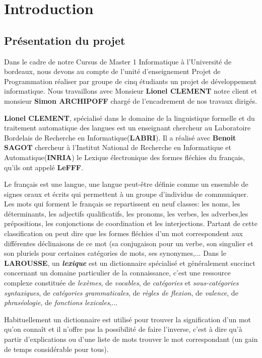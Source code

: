 \clearpage
\setcounter{page}{1}
\pagestyle{plain}
\newpage
\section{Introduction}
\subsection{Présentation du projet}
Dans le cadre de notre Cursus de Master 1 Informatique à l'Université de bordeaux, nous devons au compte de l'unité d'enseignement Projet de Programmation réaliser par groupe de cinq étudiants un projet de développement informatique. Nous travaillons avec Monsieur \textbf{Lionel CLEMENT} notre client et monsieur \textbf{Simon ARCHIPOFF} chargé de l'encadrement de nos travaux dirigés.


{\textbf{Lionel CLEMENT}, spécialisé dans le domaine de la linguistique formelle et du traitement automatique des langues est un enseignant chercheur au Laboratoire Bordelais de Recherche en Informatique(\textbf{LABRI}). Il a réalisé avec \textbf{Benoit SAGOT} chercheur à l'Institut National de Recherche en Informatique et Automatique(\textbf{INRIA})  le Lexique électronique des formes fléchies du français, qu'ils ont appelé \textbf{LeFFF}.\par}
{Le français est une langue, une langue peut-être définie comme un ensemble de signes oraux et écrits qui permettent à un groupe d'individus de communiquer. Les mots qui forment le français se repartissent en neuf classes: les noms, les déterminants, les adjectifs qualificatifs, les pronoms, les verbes, les adverbes,les prépositions, les conjonctions de coordination et les interjections. Partant de cette classification on peut dire que les formes fléchies d'un mot correspondent aux différentes déclinaisons de ce mot (sa conjugaison pour un verbe, son singulier et son pluriels pour certaines catégories de mots, ses synonymes,...
Dans le \textbf{LAROUSSE}, un \textit{\bf lexique} est un dictionnaire spécialisé et généralement succinct concernant un domaine particulier de la connaissance, c'est une ressource complexe constituée de \textit{lexèmes}, de \textit{vocables}, de \textit{catégories} et \textit{sous-catégories syntaxiques}, de \textit{catégories grammaticales}, de \textit{règles de flexion}, de \textit{valence}, de \textit{phraséologie}, de \textit{fonctions lexicales},...\par}

{Habituellement un dictionnaire est utilisé pour trouver la signification d'un mot qu'on connaît et il n'offre pas la possibilité de faire l'inverse, c'est à dire qu'à partir d'explications ou d'une liste de mots trouver le mot correspondant (un gain de temps considérable pour tous).\par}

